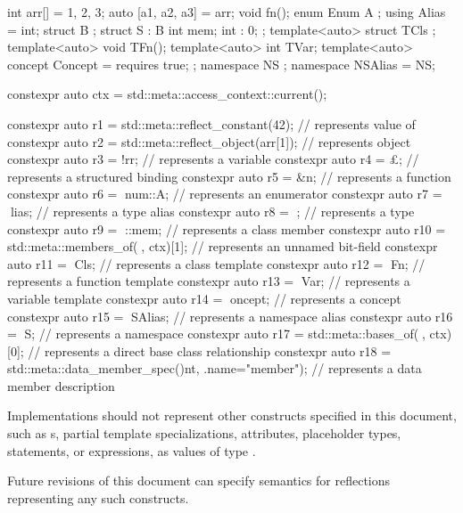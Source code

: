 \begin{example}
\begin{codeblock}
int arr[] = {1, 2, 3};
auto [a1, a2, a3] = arr;
void fn();
enum Enum { A };
using Alias = int;
struct B {};
struct S : B {
  int mem;
  int : 0;
};
template<auto> struct TCls {};
template<auto> void TFn();
template<auto> int TVar;
template<auto> concept Concept = requires { true; };
namespace NS {};
namespace NSAlias = NS;

constexpr auto ctx = std::meta::access_context::current();

constexpr auto r1 = std::meta::reflect_constant(42);        // represents  value of 
constexpr auto r2 = std::meta::reflect_object(arr[1]);      // represents  object
constexpr auto r3 = ^^arr;                                  // represents a variable
constexpr auto r4 = ^^a3;                                   // represents a structured binding
constexpr auto r5 = ^^fn;                                   // represents a function
constexpr auto r6 = ^^Enum::A;                              // represents an enumerator
constexpr auto r7 = ^^Alias;                                // represents a type alias
constexpr auto r8 = ^^S;                                    // represents a type
constexpr auto r9 = ^^S::mem;                               // represents a class member
constexpr auto r10 = std::meta::members_of(^^S, ctx)[1];    // represents an unnamed bit-field
constexpr auto r11 = ^^TCls;                                // represents a class template
constexpr auto r12 = ^^TFn;                                 // represents a function template
constexpr auto r13 = ^^TVar;                                // represents a variable template
constexpr auto r14 = ^^Concept;                             // represents a concept
constexpr auto r15 = ^^NSAlias;                             // represents a namespace alias
constexpr auto r16 = ^^NS;                                  // represents a namespace
constexpr auto r17 = std::meta::bases_of(^^S, ctx)[0];      // represents a direct base class relationship
constexpr auto r18 =
  std::meta::data_member_spec(^^int, {.name="member"});     // represents a data member description
\end{codeblock}
\end{example}

\pnum
\recommended
Implementations should not represent other constructs
specified in this document, such as
s,
partial template specializations,
attributes, placeholder types,
statements, or
expressions,
as values of type .
\begin{note}
Future revisions of this document can specify semantics for reflections
representing any such constructs.
\end{note}

